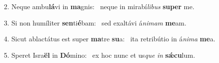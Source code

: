 2. Neque ambu\textbf{lá}vi in \textbf{ma}gnis: \ast\  neque in mirabí\textit{li}\textit{bus} \textbf{su}\textbf{per} me.\

3. Si non humíliter \textbf{sen}ti\textbf{é}bam: \ast\  sed exaltávi á\textit{ni}\textit{mam} \textbf{me}am.\

4. Sicut ablactátus est super \textbf{ma}tre \textbf{su}a: \ast\  ita retribútio in á\textit{ni}\textit{ma} \textbf{me}a.\

5. Speret Isra\textbf{ël} in \textbf{Dó}mino: \ast\  ex hoc nunc et us\textit{que} \textit{in} \textbf{sǽ}\textbf{cu}lum.\

